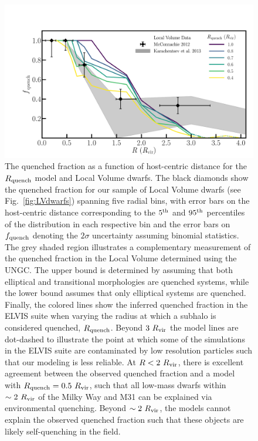 \begin{figure}
 \centering
 \hspace*{-0.1in}
 \includegraphics[width=6in]{fieldquench/fig2.pdf}
 \caption[Radial quenched fraction for Ram-Pressure Model]{The quenched fraction as a function of host-centric distance for the
   $R_{\rm quench}$ model and Local Volume dwarfs. The black diamonds show the
   quenched fraction for our sample of Local Volume dwarfs (see
   Fig.~\ref{fig:LVdwarfs}) spanning five radial bins, with error bars on the
   host-centric distance corresponding to the $5^{\rm th}$ and $95^{\rm th}$
   percentiles of the distribution in each respective bin and the error bars on
   $f_{\rm quench}$ denoting the $2\sigma$ uncertainty assuming binomial
   statistics. The grey shaded region illustrates a complementary measurement of
   the quenched fraction in the Local Volume determined using the UNGC. The
   upper bound is determined by assuming that both elliptical and transitional
   morphologies are quenched systems, while the lower bound assumes that only
   elliptical systems are quenched. Finally, the colored lines show the inferred
   quenched fraction in the ELVIS suite when varying the radius at which a
   subhalo is considered quenched, $R_{\rm quench}$. Beyond $3~R_{\rm{vir}}$
   the model lines are dot-dashed to illustrate the point at which
   some of the simulations in the ELVIS suite are contaminated by low
   resolution particles such that our modeling is less reliable.
   At $R < 2~R_{\rm{vir}}$, there is excellent agreement between the
   observed quenched fraction and a model with 
   $R_{\rm quench}=0.5~R_{\rm{vir}}$, such that all low-mass dwarfs within
   $\sim2~R_{\rm{vir}}$ of the Milky Way and M31 can be explained via environmental
   quenching. Beyond $\sim2~R_{\rm{vir}}$, the models cannot explain the
   observed quenched fraction such that these objects are likely
   self-quenching in the field. }
 \label{fig:rq}
\end{figure}

